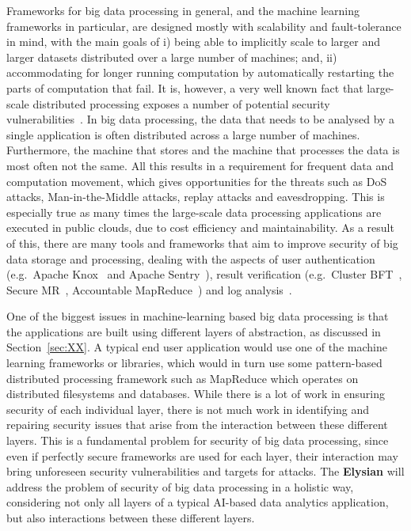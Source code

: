 \documentclass[a4paper,11pt]{article}
\newcommand{\project}[1]{\textbf{#1}\xspace}
\newcommand{\SECURITY}{\project{Elysian}}
\newcommand{\TheProject}{\SECURITY}
\begin{document}
Frameworks for big data processing in general, and the machine learning frameworks in particular, are designed mostly with scalability and fault-tolerance in mind, with the main goals of i) being able to implicitly scale to larger and larger datasets distributed over a large number of machines; and, ii) accommodating for longer running computation by automatically restarting the parts of computation that fail. It is, however, a very well known fact that large-scale distributed processing exposes a number of potential security vulnerabilities~\cite{bigdatasecurity}. In big data processing, the data that needs to be analysed by a single application is often distributed across a large number of machines. Furthermore, the machine that stores and the machine that processes the data is most often not the same. All this results in a requirement for frequent data and computation movement, which gives opportunities for the threats such as DoS attacks, Man-in-the-Middle attacks, replay attacks and eavesdropping. This is especially true as many times the large-scale data processing applications are executed in public clouds, due to cost efficiency and maintainability. As a result of this, there are many tools and frameworks that aim to improve security of big data storage and processing, dealing with the aspects of user authentication (e.g.~Apache Knox~\cite{knox} and Apache Sentry~\cite{sentry}), result verification (e.g.~Cluster BFT~\cite{bft}, Secure MR~\cite{securemr}, Accountable MapReduce~\cite{accountablemr}) and log analysis~\cite{loganalysis}. 

One of the biggest issues in machine-learning based big data processing is that the applications are built using different layers of abstraction, as discussed in Section~\ref{sec:XX}. A typical end user application would use one of the machine learning frameworks or libraries, which would in turn use some pattern-based distributed processing framework such as MapReduce which operates on distributed filesystems and databases. While there is a lot of work in ensuring security of each individual layer, there is not much work in identifying and repairing security issues that arise from the interaction between these different layers. This is a fundamental problem for security of big data processing, since even if perfectly secure frameworks are used for each layer, their interaction may bring unforeseen security vulnerabilities and targets for attacks. The \TheProject{} will address the problem of security of big data processing in a holistic way, considering not only all layers of a typical AI-based data analytics application, but also interactions between these different layers.
\end{document}
